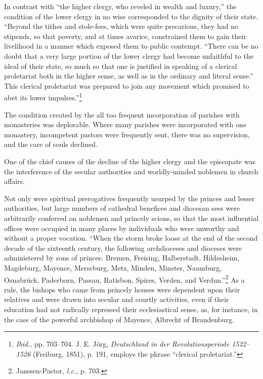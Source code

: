 In contrast with “the higher clergy, who reveled in wealth and
luxury,” the condition of the lower clergy in no wise corresponded to
the dignity of their state. “Beyond the tithes and stole-fees, which
were quite precarious, they had no stipends, so that poverty, and at
times avarice, constrained them to gain their livelihood in a manner
which exposed them to public contempt. “There can be no doubt that
a very large portion of the lower clergy had become unfaithful to
the ideal of their state, so much so that one is justified in speaking of
a clerical proletariat both in the higher sense, as well as in the ordinary
and literal sense.” This clerical proletariat was prepared to join
any movement which promised to abet its lower impulses.”\footnote
{\textit{Ibid.}, pp. 703--704. J. E. Jörg, \textit{Deutschland in der Revolutionsperiode 1522--1526} (Freiburg,
1851), p. 191, employs the phrase “clerical proletariat.”}

The condition created by the all too frequent incorporation of
parishes with monasteries was deplorable. Where many parishes were
incorporated with one monastery, incompetent pastors were frequently
sent, there was no supervision, and the care of souls declined.


One of the chief causes of the decline of the higher clergy and the
episcopate was the interference of the secular authorities and worldly-minded
noblemen in church affairs.

Not only were spiritual prerogatives frequently usurped by the
princes and lesser authorities, but large numbers of cathedral benefices
and diocesan sees were arbitrarily conferred on noblemen and princely
scions, so that the most influential offices were occupied in many
places by individuals who were unworthy and without a proper vocation.
“When the storm broke loose at the end of the second decade of
the sixteenth century, the following archdioceses and dioceses were
administered by sons of princes: Bremen, Freising, Halberstadt, Hildesheim,
Magdeburg, Mayence, Merseburg, Metz, Minden, Minster,
Naumburg, Osnabrück, Paderborn, Passau, Ratisbon, Spires, Verden,
and Verdun.”\footnote{Janssen-Pastor, \textit{l.c.}, p. 703.}
As a rule, the bishops who came from princely houses
were dependent upon their relatives and were drawn into secular and
courtly activities, even if their education had not radically repressed
their ecclesiastical sense, as, for instance, in the case of the powerful
archbishop of Mayence, Albrecht of Brandenburg.

